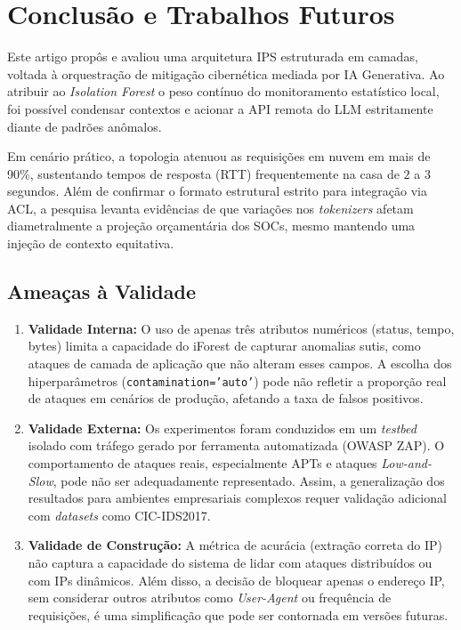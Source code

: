 \documentclass[sigconf, anonymous]{acmart}
\begin{document}
\section{Conclusão e Trabalhos Futuros}
\label{sec:conclusao}

Este artigo propôs e avaliou uma arquitetura \ac{IPS} estruturada em camadas, voltada à orquestração de mitigação cibernética mediada por IA Generativa. Ao atribuir ao \textit{Isolation Forest} o peso contínuo do monitoramento estatístico local, foi possível condensar contextos e acionar a \ac{API} remota do \ac{LLM} estritamente diante de padrões anômalos. 

Em cenário prático, a topologia atenuou as requisições em nuvem em mais de 90\%, sustentando tempos de resposta (RTT) frequentemente na casa de $2$ a $3$ segundos. Além de confirmar o formato estrutural estrito para integração via \ac{ACL}, a pesquisa levanta evidências de que variações nos \textit{tokenizers} afetam diametralmente a projeção orçamentária dos \acp{SOC}, mesmo mantendo uma injeção de contexto equitativa.

\subsection{Ameaças à Validade}

\begin{enumerate}[label=(\roman*)]
\item \textbf{Validade Interna:} O uso de apenas três atributos numéricos (status, tempo, bytes) limita a capacidade do iForest de capturar anomalias sutis, como ataques de camada de aplicação que não alteram esses campos. A escolha dos hiperparâmetros (\texttt{contamination='auto'}) pode não refletir a proporção real de ataques em cenários de produção, afetando a taxa de falsos positivos.

\item \textbf{Validade Externa:} Os experimentos foram conduzidos em um \textit{testbed} isolado com tráfego gerado por ferramenta automatizada (OWASP ZAP). O comportamento de ataques reais, especialmente APTs e ataques \textit{Low-and-Slow}, pode não ser adequadamente representado. Assim, a generalização dos resultados para ambientes empresariais complexos requer validação adicional com \textit{datasets} como CIC-IDS2017.

\item \textbf{Validade de Construção:} A métrica de acurácia (extração correta do IP) não captura a capacidade do sistema de lidar com ataques distribuídos ou com IPs dinâmicos. Além disso, a decisão de bloquear apenas o endereço IP, sem considerar outros atributos como \textit{User-Agent} ou frequência de requisições, é uma simplificação que pode ser contornada em versões futuras.

\end{enumerate}
\end{document}
